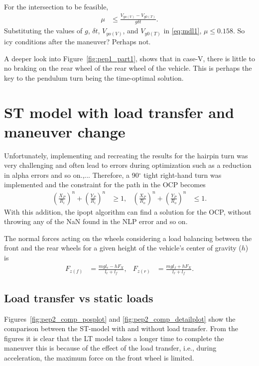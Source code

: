 For the intersection to be feasible, 
\begin{align}
    \mu &\leq \frac{V_{yo(V)} - V_{y0(T)}}{g\delta t}.\label{eq:mdl1}
\end{align}
Substituting the values of $g$, $\delta t$, $V_{yo(V)}$, and $V_{y0(T)}$ in \eqref{eq:mdl1}, $\mu \leq 0.158$. So icy conditions after the maneuver? Perhaps not. 

A deeper look into Figure~\ref{fig:pep1_part1}, shows that in case-V, there is little to no braking on the rear wheel of the rear wheel of the vehicle. This is perhaps the key to the pendulum turn being the time-optimal solution. 

\section{ST model with load transfer and maneuver change}

Unfortunately, implementing and recreating the results for the hairpin turn was very challenging and often lead to errors during optimization such as a reduction in alpha errors and so on.,... 
Therefore, a 90$^\circ$ tight right-hand turn was implemented and the constraint for the path in the OCP becomes
\begin{align}
    \left(\frac{X_P}{R_i}\right)^n + \left(\frac{Y_P}{R_i}\right)^n &\geq 1, &
    \left(\frac{X_P}{R_o}\right)^n + \left(\frac{Y_P}{R_o}\right)^n &\leq 1.
\end{align}
With this addition, the ipopt algorithm can find a solution for the OCP, without throwing any of the NaN found in the NLP error and so on. 

The normal forces acting on the wheels considering a load balancing between the front and the rear wheels for a given height of the vehicle's center of gravity ($h$) is 
\begin{align}
    F_{z(f)} &= \frac{mgl_r - hF_{X}}{l_r + l_f}, & F_{z(r)} &= \frac{mgl_f + hF_{X}}{l_r + l_f}.
\end{align}

\subsection{Load transfer vs static loads}
Figures~\ref{fig:pep2_comp_posplot} and \ref{fig:pep2_comp_detailplot} show the comparison between the ST-model with and without load transfer. From the figures it is clear that the LT model takes a longer time to complete the maneuver this is because of the effect of the load transfer, i.e., during acceleration, the maximum force on the front wheel is limited. 

